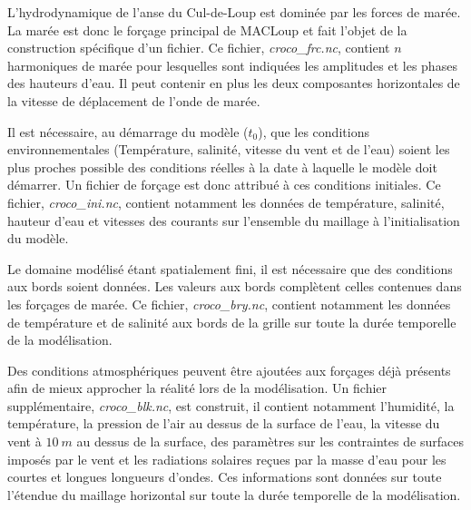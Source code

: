 \documentclass[10pt,a4paper,titlepage]{article}
\begin{document}
    L'hydrodynamique de l'anse du Cul-de-Loup est dominée par les forces de marée.
    La marée est donc le forçage principal de MACLoup et fait l'objet de la construction spécifique d'un fichier.
    Ce fichier, \textit{croco\_frc.nc}, contient $n$ harmoniques de marée pour lesquelles sont indiquées les amplitudes et les phases des hauteurs d'eau. Il peut contenir en plus les deux composantes horizontales de la vitesse de déplacement de l'onde de marée.
    
    Il est nécessaire, au démarrage du modèle ($t_0$), que les conditions environnementales (Température, salinité, vitesse du vent et de l'eau) soient les plus proches possible des conditions réelles à la date à laquelle le modèle doit démarrer.
    Un fichier de forçage est donc attribué à ces conditions initiales.
    Ce fichier, \textit{croco\_ini.nc}, contient notamment les données de température, salinité, hauteur d'eau et vitesses des courants sur l'ensemble du maillage à l'initialisation du modèle.
    
    Le domaine modélisé étant spatialement fini, il est nécessaire que des conditions aux bords soient données.
    Les valeurs aux bords complètent celles contenues dans les forçages de marée.
    Ce fichier, \textit{croco\_bry.nc}, contient notamment les données de température et de salinité %
    aux bords de la grille sur toute la durée temporelle de la modélisation.
    
    
    Des conditions atmosphériques peuvent être ajoutées aux forçages déjà présents afin de mieux approcher la réalité lors de la modélisation.
    Un fichier supplémentaire, \textit{croco\_blk.nc}, est construit, il contient notamment l'humidité, la température, la pression de l'air au dessus de la surface de l'eau, la vitesse du vent à $10~m$ au dessus de la surface, des paramètres sur les contraintes de surfaces imposés par le vent et les radiations solaires reçues par la masse d'eau pour les courtes et longues longueurs d'ondes.
    Ces informations sont données sur toute l'étendue du maillage horizontal sur toute la durée temporelle de la modélisation.
    
\end{document}
